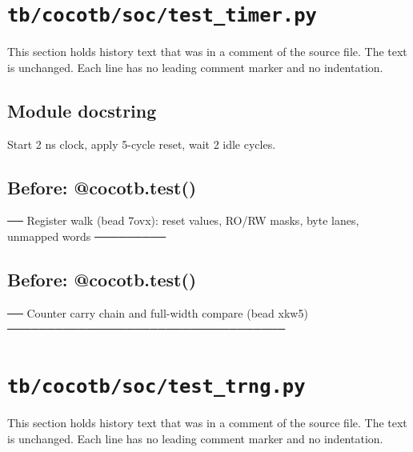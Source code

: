 \section{\texttt{tb/cocotb/soc/test\_timer.py}}\label{cr:suite:soc-test-timer}

This section holds history text that was in a comment of the source file. The text is unchanged. Each line has no leading comment marker and no indentation.

\begin{record}

\subsection*{Module docstring}

\begin{textblock}
Start 2 ns clock, apply 5-cycle reset, wait 2 idle cycles.
\end{textblock}

\subsection*{Before: @cocotb.test()}

\begin{textblock}
── Register walk (bead 7ovx): reset values, RO/RW masks, byte lanes, unmapped words ─────────
\end{textblock}

\subsection*{Before: @cocotb.test()}

\begin{textblock}
── Counter carry chain and full-width compare (bead xkw5) ───────────────────────────────────
\end{textblock}

\end{record}

\section{\texttt{tb/cocotb/soc/test\_trng.py}}\label{cr:suite:soc-test-trng}

This section holds history text that was in a comment of the source file. The text is unchanged. Each line has no leading comment marker and no indentation.

